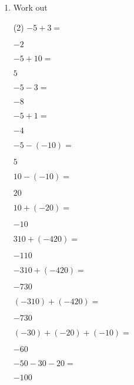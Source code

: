 \clearpage    
\begin{enumerate} [leftmargin=0cm]



\item Work out
\begin{tasks}[label=(\alph*), after-item-skip=2pt,after-skip=3pt, label-width=4ex](2)
    \task  $ -5+3=$                           \begin{envFillIn}$  -2     $    \end{envFillIn}
    \task  $ -5+10=$                          \begin{envFillIn}$   5     $    \end{envFillIn}
    \task  $ -5-3=$                           \begin{envFillIn}$  -8     $    \end{envFillIn}
    \task  $ -5+1=$                           \begin{envFillIn}$  -4     $    \end{envFillIn}
    \task  $ -5-(-10)=$                       \begin{envFillIn}$   5     $    \end{envFillIn}
    \task  $ 10-(-10)=$                       \begin{envFillIn}$  20     $    \end{envFillIn}
    \task  $ 10+(-20)=$                       \begin{envFillIn}$ -10     $    \end{envFillIn}
    \task  $ 310+(-420)=$                     \begin{envFillIn}$ -110    $    \end{envFillIn}
    \task  $ -310+(-420)=$                    \begin{envFillIn}$ -730    $    \end{envFillIn}
    \task  $ (-310)+(-420)=$                  \begin{envFillIn}$ -730    $    \end{envFillIn}
    \task  $ (-30)+(-20)+(-10)=$              \begin{envFillIn}$ -60     $    \end{envFillIn}    
    \task  $ -50-30-20=$                      \begin{envFillIn}$ -100    $    \end{envFillIn}    
\end{tasks}



\end{enumerate}
